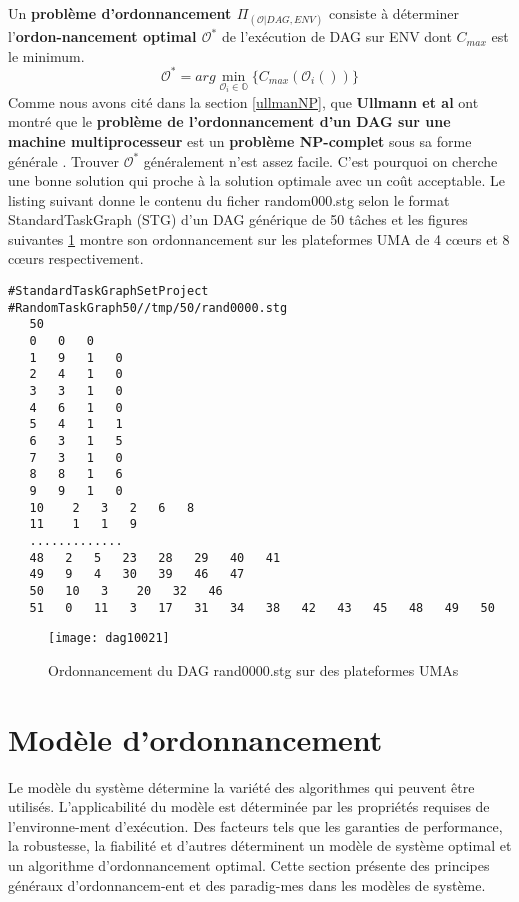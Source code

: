 Un \textbf{problème d'ordonnancement $\Pi_{( \mathcal{O} | DAG, ENV)}$} consiste à déterminer l'\textbf{ordon-nancement optimal $\mathcal{O}^*$} de l'exécution de DAG sur ENV dont $C_{max}$ est le minimum.
%
$$
\mathcal{O}^* = arg \min_{ \mathcal{O}_i \in \mathbb{O}} \{  C_{max}(\mathcal{O}_i())   \} 
$$
%
Comme nous avons cité dans la section \ref{ullmanNP}, que \textbf{Ullmann et al} ont montré que le \textbf{problème de l'ordonnancement d'un DAG sur une machine multiprocesseur} est un \textbf{problème NP-complet} sous sa forme générale \cite{Ull75}. Trouver $\mathcal{O}^*$ généralement n'est assez facile. C'est pourquoi on cherche une bonne solution qui proche à la solution optimale avec un coût acceptable.
Le listing suivant donne le contenu du ficher random000.stg selon le format StandardTaskGraph (STG) d'un DAG générique de 50 tâches et les figures suivantes \ref{fig:FG_3_1002} montre son ordonnancement sur les plateformes UMA de 4 cœurs et 8 cœurs respectivement.
%
\begin{Verbatim}[formatcom=\color{blue}]
#StandardTaskGraphSetProject
#RandomTaskGraph50//tmp/50/rand0000.stg
   50
   0   0   0
   1   9   1   0
   2   4   1   0
   3   3   1   0
   4   6   1   0
   5   4   1   1
   6   3   1   5
   7   3   1   0
   8   8   1   6
   9   9   1   0
   10    2   3   2   6   8
   11    1   1   9
   .............
   48   2   5   23   28   29   40   41
   49   9   4   30   39   46   47
   50   10   3    20   32   46
   51   0   11   3   17   31   34   38   42   43   45   48   49   50
\end{Verbatim}
%
\begin{figure}
\texttt{[image: dag10021]}
\centering
\caption{Ordonnancement du DAG rand0000.stg sur des plateformes UMAs}
\label{fig:FG_3_1002}
\end{figure}
\newpage
\section{Modèle d'ordonnancement} \label{modelSched} 
%
Le modèle du système détermine la variété des algorithmes qui peuvent être utilisés. 
L'applicabilité du modèle est déterminée par les propriétés requises de l'environne-ment d'exécution. 
Des facteurs tels que les garanties de performance, la robustesse, la fiabilité et d'autres déterminent un modèle de système optimal et un algorithme d'ordonnancement optimal. 
Cette section présente des principes généraux d'ordonnancem-ent et des paradig-mes dans les modèles de système.
%
